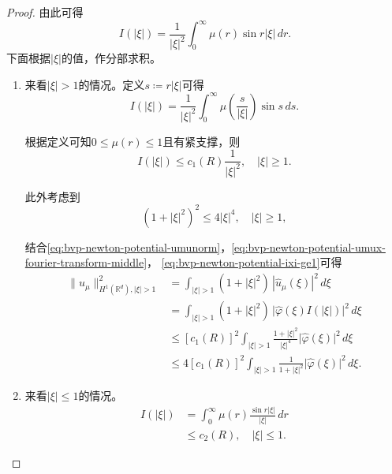 \begin{proof}
由此可得
\begin{equation*}
  I(|\xi|) = \frac{1}{|\xi|^2} \int_{0}^{\infty} \mu(r) \sin r |\xi| \, dr.
\end{equation*}
下面根据$|\xi|$的值，作分部求积。

\begin{enumerate}
\item 来看$|\xi| > 1$的情况。定义$s \coloneqq r |\xi|$可得
\begin{equation*}
  I(|\xi|) = \frac{1}{|\xi|^2} \int_{0}^{\infty} \mu \left( \frac{s}{|\xi|} \right) \sin s \, ds.
\end{equation*}

根据定义可知$0 \le \mu(r) \le 1$且有紧支撑，则
\begin{equation}
  \label{eq:bvp-newton-potential-ixi-ge1}
  I(|\xi|) \le c_{1}(R) \frac{1}{|\xi|^2}, \quad |\xi| \ge 1.
\end{equation}

此外考虑到
\begin{equation*}
  \left( 1+|\xi|^2 \right)^2 \le 4 |\xi|^4, \quad |\xi| \ge 1,
\end{equation*}

结合\eqref{eq:bvp-newton-potential-umunorm}，\eqref{eq:bvp-newton-potential-umux-fourier-transform-middle}，  \eqref{eq:bvp-newton-potential-ixi-ge1}可得
\begin{equation}
  \label{eq:bvp-newton-potential-xi-ge1}
  \begin{split}
    \big\| u_{\mu} \big\|_{H^{1}(\mathbb{R}^d), |\xi| > 1}^2 &= \int_{|\xi| > 1}
    \left( 1+ |\xi|^2 \right) \, |\widehat{u}_{\mu} (\xi) |^2 \, d \xi \\
    & =
    \int_{|\xi| > 1} \left(1+ |\xi|^2 \right) \, \big|\widehat{\varphi}(\xi) I(|\xi|) \big|^2 \, d \xi \\
    & \le \left[ c_{1}(R) \right]^{2}
    \int_{|\xi| > 1}
    \frac{1+|\xi|^2}{|\xi|^4}
    \big| \widehat{\varphi}(\xi) \big|^2 \,
    d \xi \\
    & \le 4 \left[ c_{1}(R) \right]^{2}
    \int_{|\xi| > 1}
    \frac{1}{ 1 + |\xi|^2 }
    \big| \widehat{\varphi}(\xi) \big|^2 \,
    d \xi.
  \end{split}
\end{equation}

\item 来看$|\xi| \le 1$的情况。
\begin{equation}
  \label{eq:bvp-newton-potential-ixi-le1}
\begin{split}
    I(|\xi|) &= \int_{0}^{\infty} \mu(r) \frac{\sin r |\xi|}{|\xi|} \, dr \\
    & \le c_{2}(R), \quad |\xi| \le 1.
\end{split}
\end{equation}


\end{enumerate}
\end{proof}
